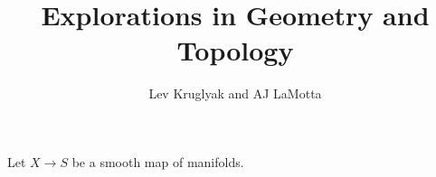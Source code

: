 \documentclass{lkx_paper}
\title{\textbf{Explorations in Geometry and Topology}}
\date{}
\author{Lev Kruglyak and AJ LaMotta}
\begin{document}
\maketitle

\begin{definition}
  Let $X \to S$ be a smooth map of manifolds.
\end{definition}
\end{document}
